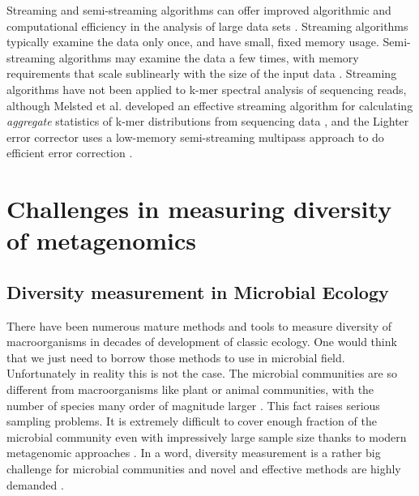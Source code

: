 Streaming and semi-streaming algorithms can offer improved algorithmic and
computational efficiency in the analysis of large data sets \cite{Charikar2004,
Cormode2005}.  Streaming algorithms typically examine the data only once, and
have small, fixed memory usage. Semi-streaming algorithms may examine the data
a few times, with memory requirements that scale sublinearly with the size of
the input data \cite{Feigenbaum2005}.  Streaming algorithms have not been
applied to k-mer spectral analysis of sequencing reads, although Melsted et al.
developed an effective streaming algorithm for calculating {\em aggregate}
statistics of k-mer distributions from sequencing data \cite{Melsted2014}, and
the Lighter error corrector uses a low-memory semi-streaming multipass approach
to do efficient error correction \cite{lighter}.


\section{Challenges in measuring diversity of metagenomics}


\subsection{Diversity measurement in Microbial Ecology}

There have been numerous mature methods and tools to measure diversity of
macroorganisms in decades of development of classic ecology. One would think
that we just need to borrow those methods to use in microbial field.
Unfortunately in reality this is not the case. The microbial communities are so
different from macroorganisms like plant or animal communities, with the number
of species many order of magnitude larger \cite{Whitman:1998aa}. This fact
raises serious sampling problems. It is extremely difficult to cover enough
fraction of the microbial community even with impressively large sample size
thanks to modern metagenomic approaches \cite{Roesch:2007aa}. In a word,
diversity measurement is a rather big challenge for microbial communities and
novel and effective methods are highly demanded \cite{Schloss:2005aa}.

